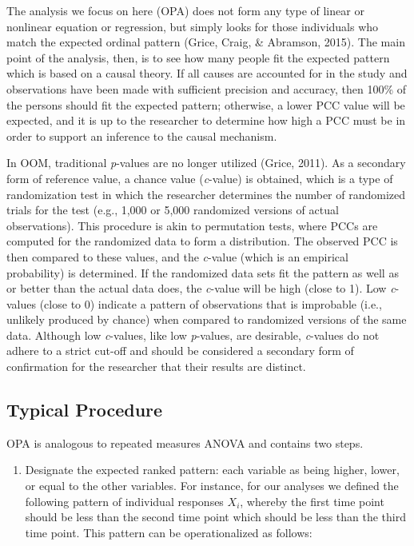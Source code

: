 \documentclass[,man, mask]{apa6}
\providecommand{\tightlist}{%
  \setlength{\itemsep}{0pt}\setlength{\parskip}{0pt}}
\theoremstyle{definition}
\theoremstyle{definition}
\theoremstyle{definition}
\theoremstyle{remark}
\begin{document}
The analysis we focus on here (OPA) does not form any type of linear or
nonlinear equation or regression, but simply looks for those individuals
who match the expected ordinal pattern (Grice, Craig, \& Abramson,
2015). The main point of the analysis, then, is to see how many people
fit the expected pattern which is based on a causal theory. If all
causes are accounted for in the study and observations have been made
with sufficient precision and accuracy, then 100\% of the persons should
fit the expected pattern; otherwise, a lower PCC value will be expected,
and it is up to the researcher to determine how high a PCC must be in
order to support an inference to the causal mechanism.

In OOM, traditional \emph{p}-values are no longer utilized (Grice,
2011). As a secondary form of reference value, a chance value
(\emph{c}-value) is obtained, which is a type of randomization test in
which the researcher determines the number of randomized trials for the
test (e.g., 1,000 or 5,000 randomized versions of actual observations).
This procedure is akin to permutation tests, where PCCs are computed for
the randomized data to form a distribution. The observed PCC is then
compared to these values, and the \emph{c}-value (which is an empirical
probability) is determined. If the randomized data sets fit the pattern
as well as or better than the actual data does, the \emph{c}-value will
be high (close to 1). Low \emph{c}-values (close to 0) indicate a
pattern of observations that is improbable (i.e., unlikely produced by
chance) when compared to randomized versions of the same data. Although
low \emph{c}-values, like low \emph{p}-values, are desirable,
\emph{c}-values do not adhere to a strict cut-off and should be
considered a secondary form of confirmation for the researcher that
their results are distinct.

\subsection{Typical Procedure}\label{typical-procedure-2}

OPA is analogous to repeated measures ANOVA and contains two steps.

\begin{enumerate}
\def\labelenumi{\arabic{enumi})}
\tightlist
\item
  Designate the expected ranked pattern: each variable as being higher,
  lower, or equal to the other variables. For instance, for our analyses
  we defined the following pattern of individual responses \(X_i\),
  whereby the first time point should be less than the second time point
  which should be less than the third time point. This pattern can be
  operationalized as follows:
\end{enumerate}
\end{document}
